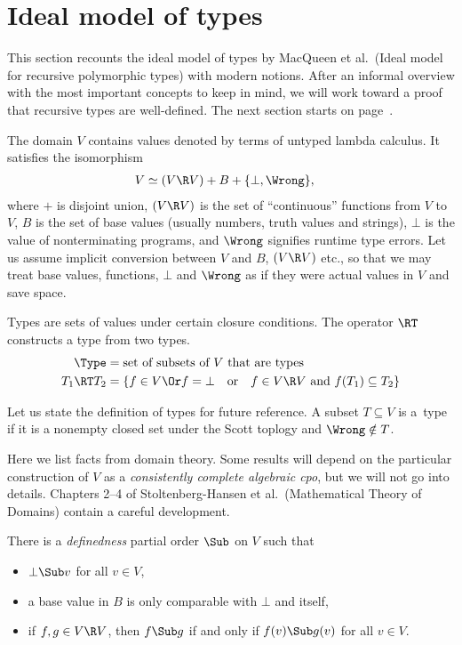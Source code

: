 \documentclass{amsart}
\begin{document}
\section{Ideal model of types}

This section recounts the ideal model of types by MacQueen et
al.\ (Ideal model for recursive polymorphic types) with modern
notions. After an informal overview with the most important
concepts to keep in mind, we will work toward a proof that
recursive types are well-defined. The next section starts on
page~\pageref{domain-theory-ends}.


The domain $V$ contains values denoted by terms of untyped lambda
calculus. It satisfies the isomorphism
\begin{align}
\label{domain-eq}
V&\simeq (V\R V)+B+\{\bot,\Wrong\},
\end{align}
where $+$ is disjoint union, $(V\R V)$ is the set of
``continuous'' functions from $V$ to $V$, $B$ is the set of base
values (usually numbers, truth values and strings), $\bot$ is the
value of nonterminating programs, and $\Wrong$ signifies runtime
type errors. Let us assume implicit conversion between $V$ and
$B$, $(V\R V)$ etc., so that we may treat base values, functions,
$\bot$ and $\Wrong$ as if they were actual values in $V$ and save
space.

Types are sets of values under certain closure conditions. The
operator $\RT$ constructs a type from two types.
\begin{align*}
\Type &= \text{set of subsets of $V$ that are types}\\
T_1\RT T_2 &= \{f\in V
\Or
f=\bot\quad\text{or}\quad
f\in V\R V\text{ and }f(T_1)\subseteq T_2
\}
\end{align*}

Let us state the definition of types for future reference. A
subset $T\subseteq V$ is a~type if it is a nonempty closed set
under the Scott toplogy and $\Wrong\notin T$.

\label{domain-theory}

Here we list facts from domain theory. Some results will depend
on the particular construction of $V$ as a \emph{consistently
complete algebraic cpo}, but we will not go into details.
Chapters 2--4 of Stoltenberg-Hansen et al.\ (Mathematical Theory
of Domains) contain a careful development.

There is a \emph{definedness} partial order $\Sub$ on $V$ such
that
\begin{itemize}
\item $\bot\Sub v$ for all $v\in V$,
\item a base value in $B$ is only comparable with $\bot$ and
itself,
\item if $f,g\in V\R V$, then $f\Sub g$ if and only if $f(v)\Sub
g(v)$ for all $v\in V$.
\end{itemize}
\end{document}
